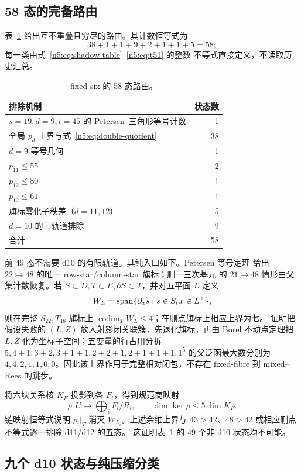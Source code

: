 \subsection{58 态的完备路由}

表~\ref{n5:tab:routes} 给出互不重叠且穷尽的路由。其计数恒等式为
\[
38+1+1+9+2+1+1+5=58;
\]
每一类由式~\eqref{n5:eq:shadow-table}--\eqref{n5:eq:t51} 的整数
不等式直接定义，不读取历史汇总。

\begin{table}[ht]
\centering
\caption{fixed-six 的 58 态路由。}\label{n5:tab:routes}
\begin{tabular}{@{}lr@{}}
\toprule
排除机制 & 状态数\\ \midrule
\(s=19,d=9,t=45\) 的 Petersen--三角形等号计数 &1\\
全局 \(p_d\) 上界与式~\eqref{n5:eq:double-quotient} &38\\
\(d=9\) 等号几何 &1\\
\(p_{11}\le55\) &2\\
\(p_{12}\le80\) &1\\
\(p_{12}\le61\) &1\\
旗标零化子秩差（\(d=11,12\)） &5\\
\(d=10\) 的三轨道排除 &9\\ \midrule
合计 &58\\ \bottomrule
\end{tabular}
\end{table}

前 49 态不需要 d10 的有限轨道。其纯入口如下。Petersen 等号定理
给出 \(22\mapsto48\) 的唯一 row-star/column-star 旗标；删一三次基元
的 \(21\mapsto48\) 情形由父集计数恢复。若
\(S\subset D,T\subset E,\partial S\subset T\)，并对五平面 \(L\) 定义
\[
 W_L=\operatorname{span}\{\partial_xs:s\in S, x\in L^\perp\},
\]
则在完整 \(S_{22},T_{48}\) 旗标上
\(\operatorname{codim}_T W_L\le4\)；在删点旗标上相应上界为七。
证明把假设失败的 \((L,Z)\) 放入射影闭关联簇，先退化旗标，再由
Borel 不动点定理把 \(L,Z\) 化为坐标子空间；五变量的行占用分拆
\(5,4+1,3+2,3+1+1,2+2+1,2+1+1+1,1^5\) 的父泛函最大数分别为
\(4,4,2,1,1,0,0\)。因此该上界作用于完整相对闭包，不存在
fixed-fibre 到 mixed--Rees 的跳步。

将六块关系核 \(K_F\) 投影到各 \(F_i\)，得到规范商映射
\[
 \rho:U\longrightarrow\bigoplus_iF_i/R_i,\qquad
 \dim\ker\rho\le5\dim K_F.
\]
链映射恒等式说明 \(\rho_i|_T\) 消灭 \(W_{L_i}\)。上述余维上界与
\(43>42\)、\(48>42\) 或相应删点不等式逐一排除 d11/d12 的五态。
这证明表~\ref{n5:tab:routes} 的 49 个非 d10 状态均不可能。

\subsection{九个 d10 状态与纯压缩分类}

